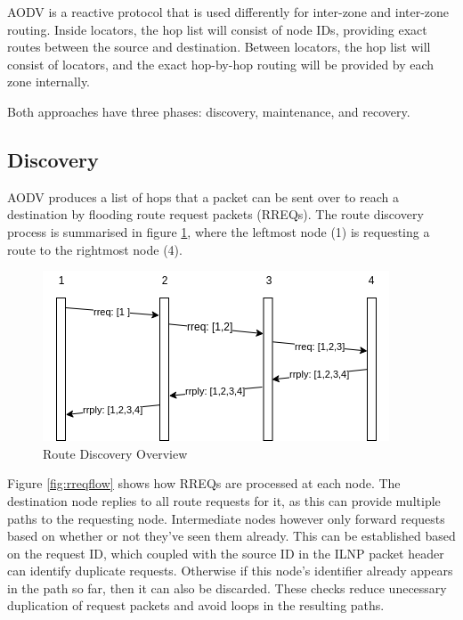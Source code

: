 \documentclass[12pt]{article}
\begin{document}
AODV is a reactive protocol that is used differently for inter-zone and inter-zone routing. Inside locators, the hop list will consist of node IDs, providing exact routes between the source and destination. Between locators, the hop list will consist of locators, and the exact hop-by-hop routing will be provided by each zone internally.

Both approaches have three phases: discovery, maintenance, and recovery.

\subsection{Discovery}

AODV produces a list of hops that a packet can be sent over to reach a destination by flooding route request packets (RREQs). The route discovery process is summarised in figure \ref{fig:path}, where the leftmost node (1) is requesting a route to the rightmost node (4).

\begin{figure}[!ht]
	\centering
	\includegraphics[width=\linewidth]{images/path}
	\caption{Route Discovery Overview}
	\label{fig:path}
\end{figure}

Figure \ref{fig:rreqflow} shows how RREQs are processed at each node. The destination node replies to all route requests for it, as this can provide multiple paths to the requesting node. Intermediate nodes however only forward requests based on whether or not they've seen them already. This can be established based on the request ID, which coupled with the source ID in the ILNP packet header can identify duplicate requests. Otherwise if this node's identifier already appears in the path so far, then it can also be discarded. These checks reduce unecessary duplication of request packets and avoid loops in the resulting paths.
\end{document}
